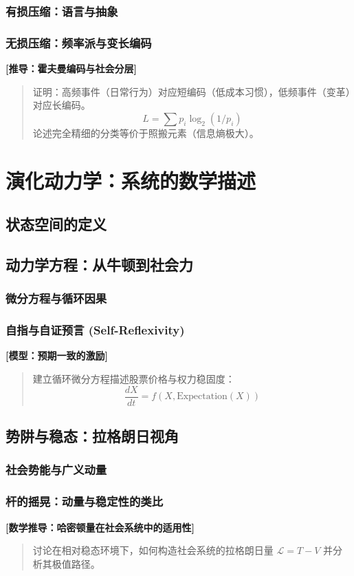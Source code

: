\documentclass[openany]{book} %
\newenvironment{derivation}[1][数学推导与模型细节]{
	\par\vspace{1em}\noindent\textbf{\color{darkgray} [#1]} \itshape \small
	\begin{quote}\color{gray}
	}{
	\end{quote}\par\vspace{1em}
}
\begin{document}
	\subsection{有损压缩：语言与抽象}
	\subsection{无损压缩：频率派与变长编码}
	\begin{derivation}[推导：霍夫曼编码与社会分层]
		证明：高频事件（日常行为）对应短编码（低成本习惯），低频事件（变革）对应长编码。
		$$ L = \sum p_i \log_2(1/p_i) $$
		论述完全精细的分类等价于照搬元素（信息熵极大）。
	\end{derivation}

	\chapter{演化动力学：系统的数学描述}
	\section{状态空间的定义}
	\section{动力学方程：从牛顿到社会力}
	\subsection{微分方程与循环因果}
	\subsection{自指与自证预言 (Self-Reflexivity)}
	\begin{derivation}[模型：预期一致的激励]
		建立循环微分方程描述股票价格与权力稳固度：
		$$ \frac{dX}{dt} = f(X, \text{Expectation}(X)) $$
	\end{derivation}

	\section{势阱与稳态：拉格朗日视角}
	\subsection{社会势能与广义动量}
	\subsection{杆的摇晃：动量与稳定性的类比}
	\begin{derivation}[数学推导：哈密顿量在社会系统中的适用性]
		讨论在相对稳态环境下，如何构造社会系统的拉格朗日量 $\mathcal{L} = T - V$ 并分析其极值路径。
	\end{derivation}
\end{document}
